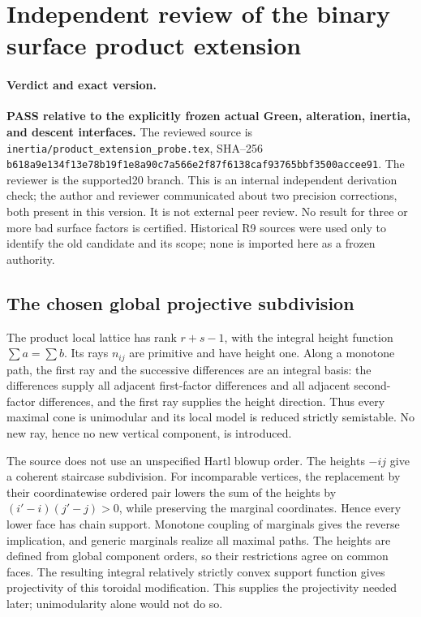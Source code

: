 \section{Independent review of the binary surface product extension}
\label{r20audit:PX20supported}

\paragraph{Verdict and exact version.}
\textbf{PASS relative to the explicitly frozen actual Green,
alteration, inertia, and descent interfaces.}
The reviewed source is
\texttt{inertia/product\_extension\_probe.tex}, SHA--256
\texttt{b618a9e134f13e78b19f1e8a90c7a566e2f87f6138caf93765bbf3500accee91}.
The reviewer is the supported20 branch. This is an internal independent
derivation check; the author and reviewer communicated about two
precision corrections, both present in this version. It is not external
peer review. No result for three or more bad surface factors is certified.
Historical R9 sources were used only to identify the old candidate and
its scope; none is imported here as a frozen authority.

\subsection{The chosen global projective subdivision}

The product local lattice has rank $r+s-1$, with the integral height
function $\sum a=\sum b$. Its rays $n_{ij}$ are primitive and have
height one. Along a monotone path, the first ray and the successive
differences are an integral basis: the differences supply all adjacent
first-factor differences and all adjacent second-factor differences,
and the first ray supplies the height direction. Thus every maximal
cone is unimodular and its local model is reduced strictly semistable.
No new ray, hence no new vertical component, is introduced.

The source does not use an unspecified Hartl blowup order. The heights
$-ij$ give a coherent staircase subdivision. For incomparable vertices,
the replacement by their coordinatewise ordered pair lowers the sum
of the heights by $(i'-i)(j'-j)>0$, while preserving the marginal
coordinates. Hence every lower face has chain support. Monotone
coupling of marginals gives the reverse implication, and generic
marginals realize all maximal paths. The heights are defined from
global component orders, so their restrictions agree on common faces.
The resulting integral relatively strictly convex support function
gives projectivity of this toroidal modification. This supplies the
projectivity needed later; unimodularity alone would not do so.


